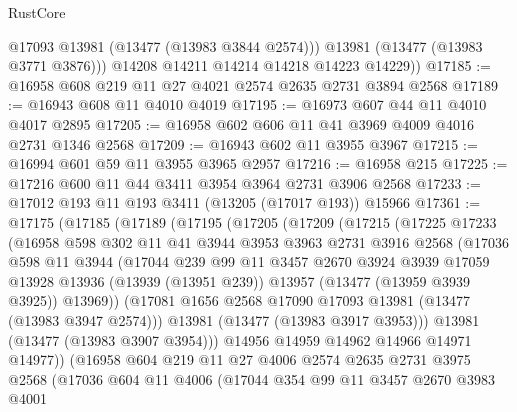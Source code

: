 \begin{lexlean}{RustCore}
\begin{coremodule}
            @17093
            @13981
            (@13477 (@13983 @3844 @2574)))
          @13981
          (@13477 (@13983 @3771 @3876)))
        @14208
        @14211
        @14214
        @14218
        @14223
        @14229))
@17185 := @16958 @608 @219 @11 @27 @4021 @2574 @2635 @2731 @3894 @2568
@17189 := @16943 @608 @11 @4010 @4019
@17195 := @16973 @607 @44 @11 @4010 @4017 @2895
@17205 := @16958 @602 @606 @11 @41 @3969 @4009 @4016 @2731 @1346 @2568
@17209 := @16943 @602 @11 @3955 @3967
@17215 := @16994 @601 @59 @11 @3955 @3965 @2957
@17216 := @16958 @215
@17225 := @17216 @600 @11 @44 @3411 @3954 @3964 @2731 @3906 @2568
@17233 := @17012 @193 @11 @193 @3411 (@13205 (@17017 @193)) @15966
@17361 := @17175
    (@17185
      (@17189
        (@17195
          (@17205
            (@17209
              (@17215
                (@17225
                  @17233
                  (@16958
                    @598
                    @302
                    @11
                    @41
                    @3944
                    @3953
                    @3963
                    @2731
                    @3916
                    @2568
                    (@17036
                      @598
                      @11
                      @3944
                      (@17044
                        @239
                        @99
                        @11
                        @3457
                        @2670
                        @3924
                        @3939
                        @17059
                        @13928
                        @13936
                        (@13939 (@13951 @239))
                        @13957
                        (@13477 (@13959 @3939 @3925))
                        @13969))
                    (@17081 @1656 @2568 @17090 @17093 @13981 (@13477 (@13983 @3947 @2574)))
                    @13981
                    (@13477 (@13983 @3917 @3953)))
                  @13981
                  (@13477 (@13983 @3907 @3954)))
                @14956
                @14959
                @14962
                @14966
                @14971
                @14977))
            (@16958
              @604
              @219
              @11
              @27
              @4006
              @2574
              @2635
              @2731
              @3975
              @2568
              (@17036
                @604
                @11
                @4006
                (@17044
                  @354
                  @99
                  @11
                  @3457
                  @2670
                  @3983
                  @4001

\end{coremodule}
\end{lexlean}
